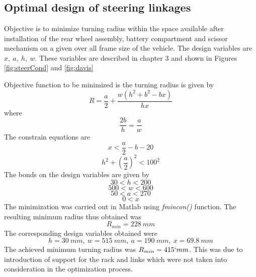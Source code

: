 \chapter{ }
\section{Optimal design of steering linkages}
\label{Ch:ApenC}

Objective is to  minimize turning radius within the space available after installation  of the rear wheel assembly, battery compartment and scissor mechanism  on a given over all frame size of the vehicle. The design variables are $x,~ a, ~h, ~w$. These variables are described in chapter 3 and shown in Figures \ref{fig:steerCond} and \ref{fig:davis}


Objective function to be minimized is the turning radius is given by
\begin{equation}
R=\dfrac{a}{2}+\dfrac{w(h^2+b^2-bx)}{hx}
\end{equation}
where
\[\dfrac{2b}{h}= \dfrac{a}{w}\]
The constrain equations are 
\[
x<\frac{a}{2}-b-20
\]
\[ h^2+\left(\dfrac{a}{2}\right)^2<100^2
\]
The bonds on the design variables are given by
\[30<h<200\]
\[500<w<600\]
\[50<a<270\]
\[0<x\]
The minimization was carried out in Matlab using \textit{fmincon()} function.
 The resulting minimum radius thus obtained was 
 \[R_{min}=228~mm\]
 The corresponding design variables obtained were 
 \[h=30~mm,~ w=515~mm, ~ a=190~mm, ~x=69.8~mm\] 
 The achieved minimum turning radius was $R_{min}=415`mm$. This was due to introduction of support for the rack and links which were not taken into consideration in the optimization process.
 